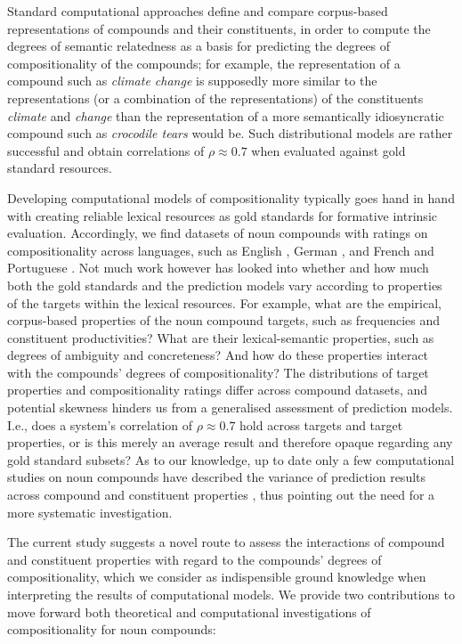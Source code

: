 \documentclass[output=paper,colorlinks,citecolor=brown]{langscibook}
\begin{document}
Standard computational approaches define and compare corpus-based representations of compounds and their constituents, in order to compute the degrees of semantic relatedness as a basis for predicting the degrees of compositionality of the compounds; for example, the representation of a compound such as \textit{climate change} is supposedly more similar to the representations (or a combination of the representations) of the constituents \textit{climate} and \textit{change} than the representation of a more semantically idiosyncratic compound such as \textit{crocodile tears} would be. Such distributional models are rather successful and obtain correlations of $\rho \approx 0.7$ when evaluated against gold standard resources.

Developing computational models of compositionality typically goes hand in hand with creating reliable lexical resources as gold standards for formative intrinsic evaluation. Accordingly, we find datasets of noun compounds with ratings on compositionality across languages, such as English \citep{ReddyEtAl:11a, CordeiroEtAl:19}, German \citep{SchulteImWaldeEtAl:13,SchulteImWaldeEtAl:16a}, and French and Portuguese \citep{CordeiroEtAl:19}.
%
Not much work however has looked into whether and how much both the gold standards and the prediction models vary according to properties of the targets within the lexical resources. For example, what are the empirical, corpus-based properties of the noun compound targets, such as frequencies and constituent productivities? What are their lexical-semantic properties, such as degrees of ambiguity and concreteness? And how do these properties interact with the compounds' degrees of compositionality? The distributions of target properties and compositionality ratings differ across compound datasets, and potential skewness hinders us from a generalised assessment of prediction models. I.e., does a system's correlation of $\rho \approx 0.7$ hold across targets and target properties, or is this merely an average result and therefore opaque regarding any gold standard subsets? As to our knowledge, up to date only a few computational studies on noun compounds have described the variance of prediction results across compound and constituent properties \citep{SchulteImWaldeEtAl:16b, Koeper/SchulteImWalde:17b, Alipoor/SchulteImWalde:20, Miletic/SchulteImWalde:23}, thus pointing out the need for a more systematic investigation.

The current study suggests a novel route to assess the interactions of compound and constituent properties with regard to the compounds' degrees of compositionality, which we consider as indispensible ground knowledge when interpreting the results of computational models. We provide two contributions to move forward both theoretical and computational investigations of compositionality for noun compounds:
\end{document}
